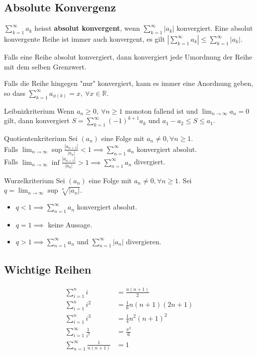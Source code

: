 \documentclass[a4paper,10pt]{article}
\def\limn{\lim_{n\to \infty}}
\def\sumk{\sum_{k=1}^\infty}
\def\R{\mathbb{R}}
\begin{document}
\subsection{Absolute Konvergenz}
$\sumk a_k$ heisst \textbf{absolut konvergent}, wenn $\sumk |a_k|$ konvergiert. Eine absolut konvergente Reihe ist immer auch konvergent, es gilt $|\sumk a_k| \le \sumk |a_k|$.

Falls eine Reihe absolut konvergiert, dann konvergiert jede Umordnung der Reihe mit dem selben Grenzwert.

Falls die Reihe hingegen "nur" konvergiert, kann es immer eine Anordnung geben, so dass $\sum_{k=1}^\infty a_{\phi(k)} = x, \ \forall x\in \R$.

\begin{subbox}{Leibnizkriterium}
Wenn $a_n \ge 0, \ \forall n \ge 1$ monoton fallend ist und $\limn a_n = 0$ gilt, dann konvergiert $S = \sumk (-1)^{k+1} a_k$ und $a_1 - a_2 \le S \le a_1$.
\end{subbox}

\begin{mainbox}{Quotientenkriterium}
Sei $(a_n)$ eine Folge mit $a_n \ne 0, \forall n \ge 1$. \\ Falls $\limn \sup \frac{|a_{n+1}|}{|a_n|} < 1 \implies \sum_{n=1}^\infty a_n$ konvergiert absolut. \\Falls $\limn \inf \frac{|a_{n+1}|}{|a_n|} > 1 \implies \sum_{n=1}^\infty a_n$ divergiert.  
\end{mainbox}

\begin{mainbox}{Wurzelkriterium}
Sei $(a_n)$ eine Folge mit $a_n \ne 0, \forall n \ge 1$. Sei $q = \limn \sup \sqrt[n]{|a_n|}$. 
\begin{itemize}
 \item $q < 1 \implies \sum_{n=1}^\infty a_n$ konvergiert absolut.
 \item $q = 1 \implies$ keine Aussage.
 \item $q > 1 \implies \sum_{n=1}^\infty a_n$ und $\sum_{n=1}^\infty |a_n|$ divergieren.
\end{itemize}
\end{mainbox}

\subsection{Wichtige Reihen}
\begin{align*}
 \sum_{i=1}^n i &= \frac{n(n+1)}{2} \\
 \sum_{i=1}^n i^2 &= \frac{1}{6}n(n+1)(2n+1) \\
 \sum_{i=1}^n i^3 &= \frac{1}{4}n^2(n+1)^2 \\
 \sum_{i=1}^\infty \frac{1}{i^2} &= \frac{\pi^2}{6} \\
 \sum_{n=1}^\infty \frac{1}{n(n+1)} &= 1
\end{align*}
\end{document}
